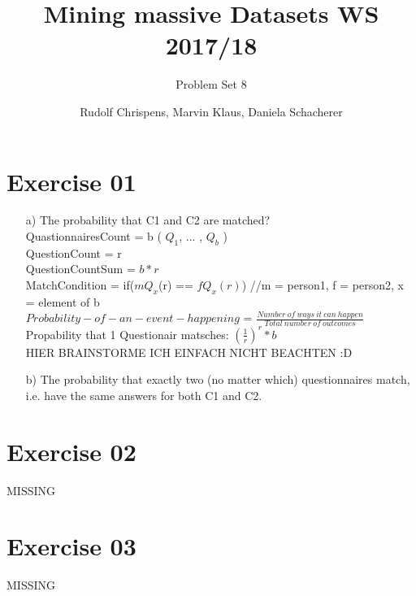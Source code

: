 \documentclass[11pt,a4paper]{scrartcl}
\title{Mining massive Datasets WS 2017/18}
\subtitle{Problem Set 8}
\author{Rudolf Chrispens, Marvin Klaus, Daniela Schacherer}
\begin{document}
\maketitle

\section*{Exercise 01}

\begin{itemize}
	\item[a)] The probability that C1 and C2 are matched?\\
	QuastionnairesCount = b ( $Q_1$, ... , $Q_b$ )\\
	QuestionCount = r \\
	QuestionCountSum = $b * r$\\
	MatchCondition = if($mQ_x$(r) == $fQ_x(r)$) //m = person1, f = person2, x = element of b\\
	$Probability-of-an-event-happening$ =  $\frac{Number\ of\ ways\ it\ can\ happen}{Total\ number\ of\ outcomes}$\\
	Propability that 1 Questionair matsches: $(\frac{1}{r})^r * b$\\
	
	HIER BRAINSTORME ICH EINFACH NICHT BEACHTEN :D
	
	\item[b)] The probability that exactly two (no matter which) questionnaires match, i.e. have
the same answers for both C1 and C2.
\end{itemize} 

\section*{Exercise 02}
MISSING

\section*{Exercise 03}
MISSING
\end{document}
